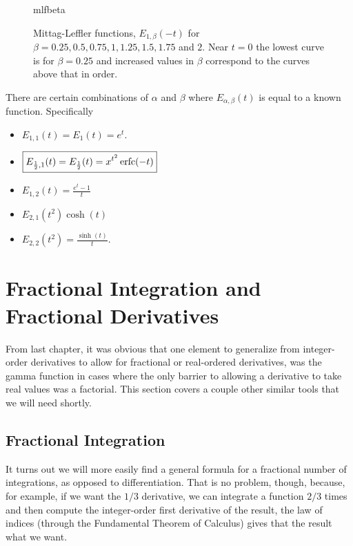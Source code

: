 \begin{figure}
  \centering
  {mlfbeta}
  \caption{Mittag-Leffler functions, $E_{1, \beta}(-t)$ for $\beta = 0.25, 0.5, 0.75, 1, 1.25, 1.5, 1.75$ and $2$. Near $t=0$ the lowest curve is for $\beta = 0.25$ and increased values in $\beta$ correspond to the curves above that in order.}
  \label{fig:mlfbeta}
\end{figure}

There are certain combinations of $\alpha$ and $\beta$ where $E_{\alpha,\beta}(t)$ is equal to a known function. Specifically
\begin{itemize}
  \item $\boxed{ E_{1,1}(t) = E_1(t) = e^t. }$
  \item $\boxed{ E_{\frac{1}{2},1} (t) = E_\frac{1}{2}(t) = x^{t^2} \operatorname{erfc}(-t)  }$
  \item $\boxed{ E_{1,2}(t) = \frac{e^t - 1}{t}  }$
  \item $\boxed{ E_{2,1}(t^2) \cosh(t) }$
  \item $\boxed{ E_{2,2 }(t^2) = \frac{\sinh(t)}{t}. }$
\end{itemize}


\section{Fractional Integration and Fractional Derivatives}

From last chapter, it was obvious that one element to generalize from integer-order derivatives to allow for fractional or real-ordered derivatives, was the gamma function in cases where the only barrier to allowing a derivative to take real values was a factorial. This section covers a couple other similar tools that we will need shortly.

\subsection{Fractional Integration}

It turns out we will more easily find a general formula for a fractional number of integrations, as opposed to differentiation. That is no problem, though, because, for example, if we want the $1/3$ derivative, we can integrate a function $2/3$ times and then compute the integer-order first derivative of the result, the law of indices (through the Fundamental Theorem of Calculus) gives that the result what we want. 

